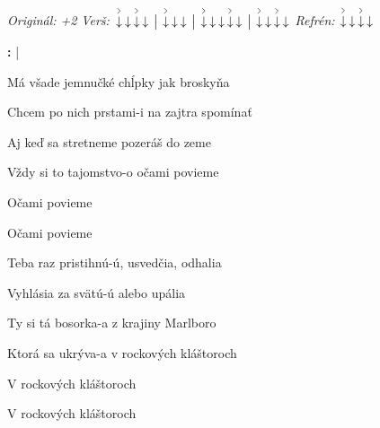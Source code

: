 \begin{song}


\begin{headerbox}
\RaiseBoxWithAccents
\textit{Originál: +2} \quad
\textit{Verš:} $\AccentDown\Down\AccentDown\Down \Separator \AccentDown\Down\Down \Separator \AccentDown\Down\Down\AccentDown\Down \Separator \AccentDown\Down\AccentDown\Down$ \quad
\textit{Refrén:} $\AccentDown\Down\AccentDown\Down$
\end{headerbox}

\begin{hchordbox}
\end{hchordbox}

\large

\bigskip

\Intro\textbf{:}     |      \par

\bigskip

 Má všade jemnučké  chĺpky jak broskyňa \par
{} Chcem po nich prstami-i na zajtra spomínať \par
{} Aj keď sa stretneme  pozeráš do zeme \par
{} Vždy si to tajomstvo-o očami povieme \par
{}   Očami povieme \par
{}   Očami povieme \par

\bigskip

 Teba raz pristihnú-ú, usvedčia, odhalia \par
{} Vyhlásia za svätú-ú alebo upália \par
{} Ty si tá bosorka-a z krajiny Marlboro \par
{} Ktorá sa ukrýva-a v rockových kláštoroch \par
{}   V rockových kláštoroch \par
{}   V rockových kláštoroch \par


\end{song}

